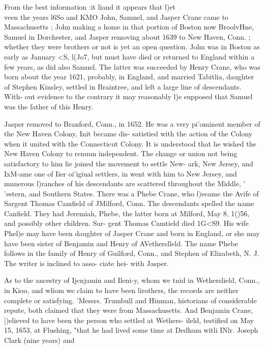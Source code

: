 \documentclass{book}
\begin{document}
From the best information :it liand it appears that l)et\\veen the 
years l6So and KMO John, Samnel, and Jasper Crane came to 
Massachusetts ; John making a home in that portion of Boston 
now BroolvHne, Samuel in Dorchester, and Jasper removing 
about 1639 to New Haven, Conn. ; whether they were brothers 
or not is yet an open question. Jolm was in Boston as early as 
January <S, l(Jo7, but must have died or returned to England 
within a few years, as did also Samuel. The latter was succeeded 
by Henry Crane, who was born about the year 1621, probably, 
in England, and married Tabitlia, daughter of Stephen Kinsley, 
settled in Braintree, and left a large line of descendants. With- 
out evidence to the contrary it may reasonably l)e supposed that 
Samuel was the father of this Henry. 

Jasper removed to Branford, Conn., in 1652. He was a very 
pi'ominent member of the New Haven Colony, Init became dis- 
satistied with the action of the Colony when it united with the 
Connecticut Colony. It is understood that he wished the New 
Haven Colony to renuun independent. The change or union not 
being satisfactory to him lie joined the movement to settle New- 
ark, New Jersey, and IxM-ame one of Iier oi'igiual settlers, in 
went with him to New Jersey, and mnnerous l)ranches of his 
descendants are scattered throughout the Middle, '\\'estern, and 
Southern States. There was a Phebe Crane, who l)ecame the Avife 
of Sargent Thomas Camfield of JMilford, Conn. The descendants 
spelled the name Canfield. They had Jeremiah, Phebe, the latter 
born at Milford, May 8, 1()56, and possibly other children. Sar- 
gent Thomas Camtield died 1G<S9. His wife Phel)e may have 
been daughter of Jasper Crane and born in England, or she may 
have been sister of Benjamin and Henry of AVetherslleld. The 
name Phebe follows in the family of Henry of Guilford, Conn., 
and Stephen of Elizabeth, N. J. The writer is inclined to asso- 
ciate hei- with Jasper. 

As to the ancestry of Ijcnjamin and Ileni-y, whom we tnid in 
Wetherslield, Conn., in Kioo, and wliom we claim to have been 
lirothers, the records are neither complete or satisfying. 'Messrs. 
Trumbull and Hinman, historians of considerable repute, both 
claimed that they were from Massachusetts. And Benjamin 
Crane, ])elieved to have been the person who settled at Wethers- 
ileld, testified on May 15, 1653, at Flushing, "that he had lived 
some time at Dedham witli INlr. Joseph Clark (nine years) and 
\end{document}
